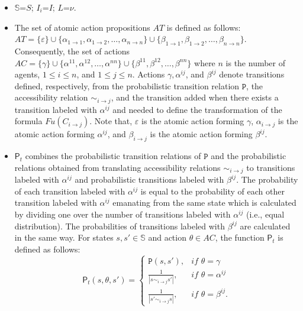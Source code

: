 \begin{itemize}
\item $\mathbb{S}$=$S$; $I_i$=$I$; $L$=$\nu$.

\item The set of atomic action propositions $AT$  is defined as
follows:\\
$AT = \{\varepsilon \} \cup \{\alpha_{1 \rightarrow 1},
\alpha_{1 \rightarrow 2}, \dots, \alpha_{n \rightarrow n}\} \cup
\{\beta_{1 \rightarrow 1}, \beta_{1 \rightarrow 2}, \dots,
\beta_{n \rightarrow n}\}$. Consequently, the set of actions $AC =
\{\gamma \} \cup \{\alpha^{11}, \alpha^{12}, \dots, \alpha^{nn}\}
\cup \{\beta^{11}, \beta^{12}, \dots, \beta^{nn}\}$ where $n$ is
the number of agents, $1 \leq i \leq n$, and $1 \leq j \leq n$.
Actions $\gamma, \alpha^{ij}$, and $\beta^{ij}$ denote transitions
defined, respectively, from the probabilistic transition relation
$\texttt{P}$, the accessibility relation $\sim_{i \rightarrow j}$,
and the transition added when there exists a transition labeled
with $\alpha^{ij}$ and needed to define the transformation of the
formula $Fu(C_{i \rightarrow j})$. Note that, $\varepsilon$ is the
atomic action forming $\gamma$, $\alpha_{i\rightarrow j}$ is the
atomic action forming $\alpha^{ij}$, and $\beta_{i\rightarrow j}$
is the atomic action forming $\beta^{ij}$.

\item $\textsf{P}_t$ combines the probabilistic transition
relations of $\texttt{P}$ and the probabilistic relations obtained
from translating accessibility relations $\sim_{i \rightarrow j}$
to transitions labeled with $\alpha^{ij}$ and probabilistic
transitions labeled with $\beta^{ij}$. The probability of each
transition labeled with $\alpha^{ij}$ is equal to the probability
of each other transition labeled with $\alpha^{ij}$ emanating from
the same state which is calculated by dividing one over the number
of transitions labeled with $\alpha^{ij}$ (i.e., equal
distribution). The probabilities of transitions labeled with
$\beta^{ij}$ are calculated in the same way. For states $s, s' \in
\mathbb{S}$ and action $\theta \in AC$, the function
$\textsf{P}_t$ is defined as follows:
\begin{equation*}
    \textsf{P}_t(s, \theta , s' )=
\begin{cases}
    \texttt{P}(s, s'),   & \textit{if } \theta = \gamma  \\
    \frac{1}{|s\sim_{i \rightarrow j} s'|},   & \textit{if } \theta = \alpha^{ij}\\
    \frac{1}{|s'\sim_{i \rightarrow j} s|},   & \textit{if } \theta = \beta^{ij}.
    \end{cases}
    \end{equation*}

\end{itemize}


